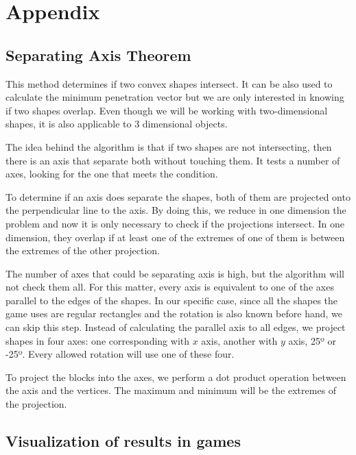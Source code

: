 \chapter{Appendix}\label{ch:appendix}

\section{Separating Axis Theorem}

This method determines if two convex shapes intersect. It can be also used to calculate the minimum penetration vector but we are only interested in knowing if two shapes overlap. Even though we will be working with two-dimensional shapes, it is also applicable to 3 dimensional objects. \cite{ericson2004real}

The idea behind the algorithm is that if two shapes are not intersecting, then there is an axis that separate both without touching them. It tests a number of axes, looking for the one that meets the condition. 

To determine if an axis does separate the shapes, both of them are projected onto the perpendicular line to the axis. By doing this, we reduce in one dimension the problem and now it is only necessary to check if the projections intersect. In one dimension, they overlap if at least one of the extremes of one of them is between the extremes of the other projection.

The number of axes that could be separating axis is high, but the algorithm will not check them all. For this matter, every axis is equivalent to one of the axes parallel to the edges of the shapes. In our specific case, since all the shapes the game uses are regular rectangles and the rotation is also known before hand, we can skip this step. Instead of calculating the parallel axis to all edges, we project shapes in four axes: one corresponding with $x$ axis, another with $y$ axis, 25º or -25º. Every allowed rotation will use one of these four. 

To project the blocks into the axes, we perform a dot product operation between the axis and the vertices. The maximum and minimum will be the extremes of the projection. 

\section{Visualization of results in games}

